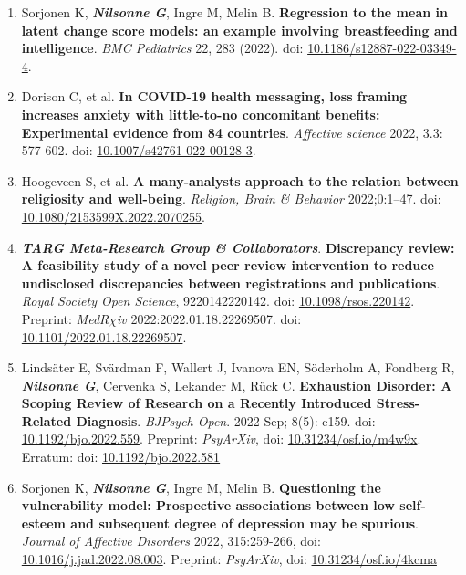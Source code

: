 \documentclass[10pt]{article}
\begin{document}
\begin{enumerate}[nolistsep]
\item Sorjonen K, \textbf{\textit{Nilsonne G}}, Ingre M, Melin B. \textbf{Regression to the mean in latent change score models: an example involving breastfeeding and intelligence}. \emph{BMC Pediatrics} 22, 283 (2022). doi: \href{https://doi.org/10.1186/s12887-022-03349-4}{10.1186/s12887-022-03349-4}.
\item Dorison C, et al. \textbf{In COVID-19 health messaging, loss framing increases anxiety with little-to-no concomitant benefits: Experimental evidence from 84 countries}. \emph{Affective science} 2022, 3.3: 577-602. doi: \href{https://doi.org/10.1007/s42761-022-00128-3}{10.1007/s42761-022-00128-3}.
\item Hoogeveen S, et al. \textbf{A many-analysts approach to the relation between religiosity and well-being}. \emph{Religion, Brain \& Behavior} 2022;0:1–47. doi: \href{https://doi.org/10.1080/2153599X.2022.2070255}{10.1080/2153599X.2022.2070255}.
\item \textbf{\textit{TARG Meta-Research Group \& Collaborators}}. \textbf{Discrepancy review: A feasibility study of a novel peer review intervention to reduce undisclosed discrepancies between registrations and publications}. \emph{Royal Society Open Science}, 9220142220142. doi: \href{https://doi.org/10.1098/rsos.220142}{10.1098/rsos.220142}. Preprint: \emph{MedR$\chi$iv} 2022:2022.01.18.22269507. doi: \href{https://doi.org/10.1101/2022.01.18.22269507}{10.1101/2022.01.18.22269507}.
\item Lindsäter E, Svärdman F, Wallert J, Ivanova EN, Söderholm A, Fondberg R, \textbf{\textit{Nilsonne G}}, Cervenka S, Lekander M, Rück C. \textbf{Exhaustion Disorder: A Scoping Review of Research on a Recently Introduced Stress-Related Diagnosis}. \emph{BJPsych Open}. 2022 Sep; 8(5): e159. doi: \href{https://doi.org/10.1192/bjo.2022.559}{10.1192/bjo.2022.559}. Preprint: \emph{PsyArXiv}, doi: \href{https://doi.org/10.31234/osf.io/m4w9x}{10.31234/osf.io/m4w9x}. Erratum: doi: \href{https://doi.org/10.1192/bjo.2022.581}{10.1192/bjo.2022.581}
\item Sorjonen K, \textbf{\textit{Nilsonne G}}, Ingre M, Melin B. \textbf{Questioning the vulnerability model: Prospective associations between low self-esteem and subsequent degree of depression may be spurious}. \emph{Journal of Affective Disorders} 2022, 315:259-266, doi:  \href{https://doi.org/10.1016/j.jad.2022.08.003}{10.1016/j.jad.2022.08.003}. Preprint: \emph{PsyArXiv}, doi: \href{https://doi.org/10.31234/osf.io/4kcma}{10.31234/osf.io/4kcma}

\end{enumerate}
\end{document}
